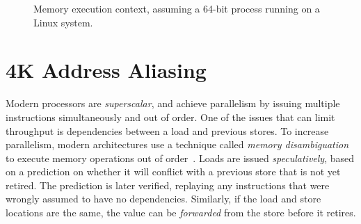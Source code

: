 \documentclass[10pt, conference, compsocconf]{IEEEtran}
\begin{document}
\begin{figure}
  \centering
  \caption{Memory execution context, assuming a 64-bit process running on a Linux system.}
  \label{fig:virtualmemory}
\end{figure}


\section{4K Address Aliasing}
\label{sec:aliasing}
Modern processors are \emph{superscalar}, and achieve parallelism by issuing multiple instructions simultaneously and out of order.
One of the issues that can limit throughput is dependencies between a load and previous stores.
To increase parallelism, modern architectures use a technique called \emph{memory disambiguation} to execute memory operations out of order~\cite{Intel:2006:InsideICM:SmartMemoryAccess}.
Loads are issued \emph{speculatively}, based on a prediction on whether it will conflict with a previous store that is not yet retired.
The prediction is later verified, replaying any instructions that were wrongly assumed to have no dependencies.
Similarly, if the load and store locations are the same, the value can be \emph{forwarded} from the store before it retires.
\end{document}
